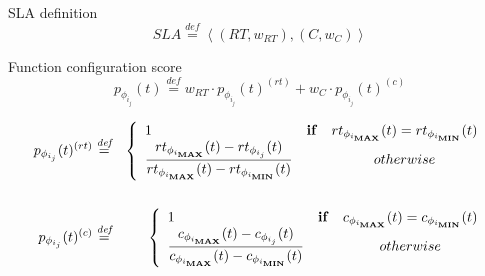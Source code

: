 \documentclass[13.5pt]{beamer}
\newcommand{\mathDef}{\overset{\textit{def}}{=}}
\begin{document}
\begin{frame}[noframenumbering]
	
	\begin{block}{SLA definition}
		\begin{equation}
			SLA \mathDef \left\langle (RT,w_{RT}),(C,w_{C}) \right\rangle \nonumber
		\end{equation}
	\end{block}
	
	\begin{block}{Function configuration score}
	\begin{equation}\label{profit}
		p_{\phi_{i_{j}}}(t) \mathDef w_{RT} \cdot p_{\phi_{i_{j}}}(t)^{(rt)} + w_{C} \cdot p_{\phi_{i_{j}}}(t)^{(c)} \nonumber
	\end{equation}
\end{block}
	
	\begin{eqnarray}
		p_{\phi_{i_{j}}}(t)^{(rt)} & \mathDef & \left\{ 
		\begin{array}{lcc}
			1 & \text{\textbf{if}} & rt_{\phi_{i_{\textbf{MAX}}}}(t) = rt_{\phi_{i_{\textbf{MIN}}}}(t) \\ 
			\dfrac{rt_{\phi_{i_{\textbf{MAX}}}}(t) - rt_{\phi_{i_{j}}}(t)}{rt_{\phi_{i_{\textbf{MAX}}}}(t) - rt_{\phi_{i_{\textbf{MIN}}}}(t)} & & otherwise \\ 
		\end{array} \right.\\\nonumber\\
		p_{\phi_{i_{j}}}(t)^{(c)} & \mathDef & \left\{ 
		\begin{array}{lcc}
			1 & \text{\textbf{if}} & c_{\phi_{i_{\textbf{MAX}}}}(t) = c_{\phi_{i_{\textbf{MIN}}}}(t) \\ 
			\dfrac{c_{\phi_{i_{\textbf{MAX}}}}(t) - c_{\phi_{i_{j}}}(t)}{c_{\phi_{i_{\textbf{MAX}}}}(t) - c_{\phi_{i_{\textbf{MIN}}}}(t)} &&otherwise \\ 
		\end{array} \right.
	\end{eqnarray}
	
	
\end{frame} 

\end{document}
